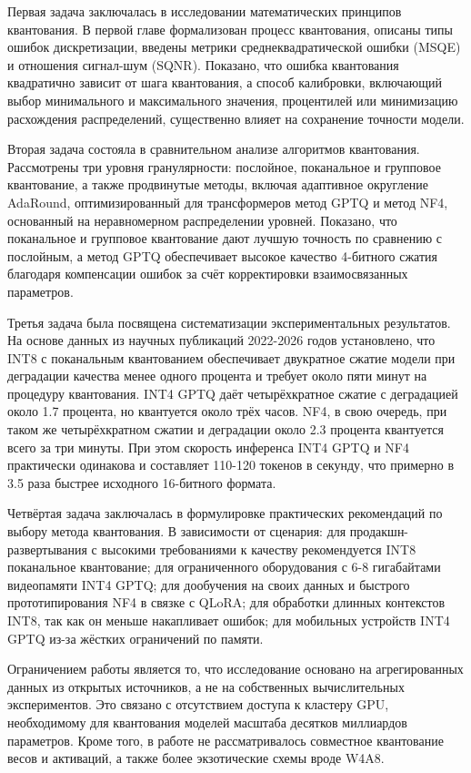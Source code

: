 \documentclass[bachelor, och, coursework]{SCWorks}
\begin{document}
	Первая задача заключалась в исследовании математических принципов квантования. В первой главе формализован процесс квантования, описаны типы ошибок дискретизации, введены метрики среднеквадратической ошибки (MSQE) и отношения сигнал-шум (SQNR). Показано, что ошибка квантования квадратично зависит от шага квантования, а способ калибровки, включающий выбор минимального и максимального значения, процентилей или минимизацию расхождения распределений, существенно влияет на сохранение точности модели.
	
	Вторая задача состояла в сравнительном анализе алгоритмов квантования. Рассмотрены три уровня гранулярности: послойное, поканальное и групповое квантование, а также продвинутые методы, включая адаптивное округление AdaRound, оптимизированный для трансформеров метод GPTQ и метод NF4, основанный на неравномерном распределении уровней. Показано, что поканальное и групповое квантование дают лучшую точность по сравнению с послойным, а метод GPTQ обеспечивает высокое качество 4-битного сжатия благодаря компенсации ошибок за счёт корректировки взаимосвязанных параметров.
	
	Третья задача была посвящена систематизации экспериментальных результатов. На основе данных из научных публикаций 2022-2026 годов установлено, что INT8 с поканальным квантованием обеспечивает двукратное сжатие модели при деградации качества менее одного процента и требует около пяти минут на процедуру квантования. INT4 GPTQ даёт четырёхкратное сжатие с деградацией около 1.7 процента, но квантуется около трёх часов. NF4, в свою очередь, при таком же четырёхкратном сжатии и деградации около 2.3 процента квантуется всего за три минуты. При этом скорость инференса INT4 GPTQ и NF4 практически одинакова и составляет 110-120 токенов в секунду, что примерно в 3.5 раза быстрее исходного 16-битного формата.
	
	Четвёртая задача заключалась в формулировке практических рекомендаций по выбору метода квантования. В зависимости от сценария: для продакшн-развертывания с высокими требованиями к качеству рекомендуется INT8 поканальное квантование; для ограниченного оборудования с 6-8 гигабайтами видеопамяти INT4 GPTQ; для дообучения на своих данных и быстрого прототипирования NF4 в связке с QLoRA; для обработки длинных контекстов INT8, так как он меньше накапливает ошибок; для мобильных устройств INT4 GPTQ из-за жёстких ограничений по памяти.
	
	Ограничением работы является то, что исследование основано на агрегированных данных из открытых источников, а не на собственных вычислительных экспериментов. Это связано с отсутствием доступа к кластеру GPU, необходимому для квантования моделей масштаба десятков миллиардов параметров. Кроме того, в работе не рассматривалось совместное квантование весов и активаций, а также более экзотические схемы вроде W4A8.
	
\end{document}
